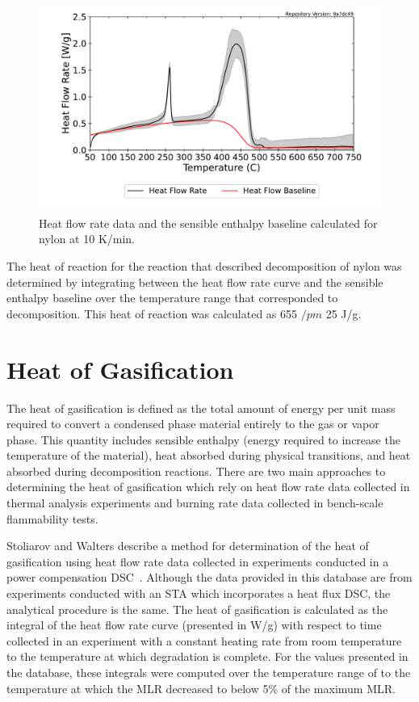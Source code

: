 \documentclass[12pt,oneside]{book}
\begin{document}
\begin{figure}[!ht]
\centering
\includegraphics[width=.75\columnwidth]{Figures/Nylon_HR_baseline.pdf}
\caption[Heat flow Rate Data and the Sensible Enthalpy Baseline Calculated for Nylon]{Heat flow rate data and the sensible enthalpy baseline calculated for nylon at 10 K/min.}
\label{fig:nylon_sensible_enthalpy}
\end{figure}

The heat of reaction for the reaction that described decomposition of nylon was determined by integrating between the heat flow rate curve and the sensible enthalpy baseline over the temperature range that corresponded to decomposition. This heat of reaction was calculated as 655 $/pm$ 25 J/g.

\section{Heat of Gasification}

The heat of gasification is defined as the total amount of energy per unit mass required to convert a condensed phase material entirely to the gas or vapor phase. This quantity includes sensible enthalpy (energy required to increase the temperature of the material), heat absorbed during physical transitions, and heat absorbed during decomposition reactions. There are two main approaches to determining the heat of gasification which rely on heat flow rate data collected in thermal analysis experiments and burning rate data collected in bench-scale flammability tests.

Stoliarov and Walters describe a method for determination of the heat of gasification using heat flow rate data collected in experiments conducted in a power compensation DSC~\cite{Stoliarov_2008}. Although the data provided in this database are from experiments conducted with an STA which incorporates a heat flux DSC, the analytical procedure is the same. The heat of gasification is calculated as the integral of the heat flow rate curve (presented in W/g) with respect to time collected in an experiment with a constant heating rate from room temperature to the temperature at which degradation is complete. For the values presented in the database, these integrals were computed over the temperature range of  to the temperature at which the MLR decreased to below 5\% of the maximum MLR.
\end{document}
